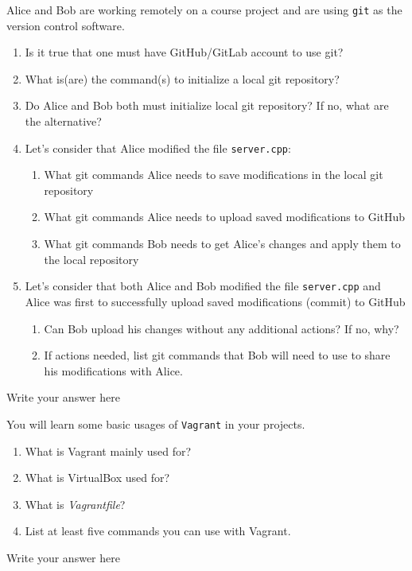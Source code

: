 \documentclass{report}
\begin{document}
\begin{problem}

Alice and Bob are working remotely on a course project and are using \texttt{git} as the version control software.

\begin{enumerate}
\item Is it true that one must have GitHub/GitLab account to use git?
\item What is(are) the command(s) to initialize a local git repository?
\item Do Alice and Bob both must initialize local git repository?  If no, what are the alternative?
\item Let's consider that Alice modified the file \texttt{server.cpp}:
    \begin{enumerate}
    \item What git commands Alice needs to save modifications in the local git repository
    \item What git commands Alice needs to upload saved modifications to GitHub
    \item What git commands Bob needs to get Alice's changes and apply them to the local repository
    \end{enumerate}
\item Let's consider that both Alice and Bob modified the file \texttt{server.cpp} and Alice was first to successfully upload saved modifications (commit) to GitHub
  \begin{enumerate}
  \item Can Bob upload his changes without any additional actions? If no, why?
  \item If actions needed, list git commands that Bob will need to use to share his modifications with Alice.
  \end{enumerate}
\end{enumerate}

  \begin{answer}{37em}
  Write your answer here
  \end{answer}

\end{problem}

\newpage


\begin{problem}

You will learn some basic usages of \texttt{Vagrant} in your projects.

\begin{enumerate}
\item What is Vagrant mainly used for?
\item What is VirtualBox used for?
\item What is \textit{Vagrantfile}?
\item List at least five commands you can use with Vagrant.
\end{enumerate}

  \begin{answer}{35em}
  Write your answer here
  \end{answer}

\end{problem}
\end{document}

